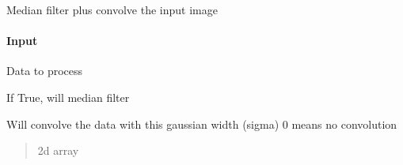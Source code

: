 \documentclass[letterpaper,10pt,english]{sphinxmanual}
\begin{document}
\begin{fulllineitems}
\label{\detokenize{api/pymusepipe:pymusepipe.util_image.prepare_image}}
\pysigstartsignatures
{}
\pysigstopsignatures
\sphinxAtStartPar
Median filter plus convolve the input image


\paragraph{Input}
\label{\detokenize{api/pymusepipe:id154}}\begin{description}
\sphinxAtStartPar
Data to process

\sphinxAtStartPar
If True, will median filter

\sphinxAtStartPar
Will convolve the data with this gaussian width (sigma)
0 means no convolution

\end{description}
\begin{quote}\begin{description}
\sphinxAtStartPar
{}

\sphinxAtStartPar
2d array

\end{description}\end{quote}

\end{fulllineitems}

\end{document}
